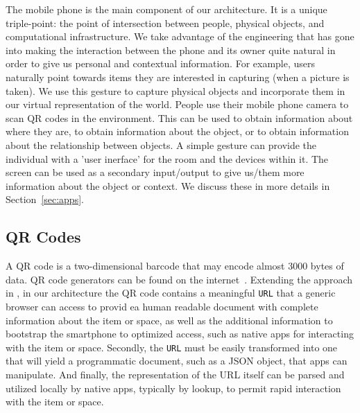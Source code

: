 The mobile phone is the main component of our architecture.  It is a unique triple-point: the point of intersection
between people, physical objects, and computational infrastructure.  We take advantage of the engineering that has gone 
into making the interaction between the phone and its owner quite natural in order to give us personal and contextual
information.  For example, users naturally point towards items they are interested in capturing (when a picture is taken).
We use this gesture to capture physical objects and incorporate them in our virtual representation of the world.
People use their mobile phone camera to scan QR codes in the environment.  This can be used to obtain information
about where they are, to obtain information about the object, or to obtain information about the relationship
between objects. A simple gesture can provide the individual with a 'user
inerface' for the room and the devices within it.
\cite{Enabling ``Smart Spaces:'' Entity Description and User Interface Generation for a Heterogeneous Component-based Distributed System 
T. D. Hodes, R. H. Katz, DARPA/NIST Smart Spaces Workshop, 
Gaithersburg, Maryland, July 1998. 
UC Berkeley Technical Report CSD/98/1008}
The screen can be used as a secondary input/output to give us/them more information about the 
object or context.  We discuss these in more details in Section~\ref{sec:apps}.

\subsection{QR Codes}
\label{sec:qrc}

A QR code is a two-dimensional barcode that may encode almost 3000 bytes of data.  QR code generators
can be found on the internet~\cite{qrcgen1, qrcgen2}.  
Extending the approach in \cite{hbci}, in
our
architecture the QR code contains a meaningful {\tt URL} that a
generic browser can access to provid ea human readable document with complete
information about the item or space, as well as the additional
information to bootstrap the smartphone to optimized access, such as
native apps for interacting with the item or space.  Secondly, the 
{\tt URL}  must be easily transformed into one that will yield a
programmatic document, such as a JSON object, that apps can
manipulate.  And finally, the representation of the URL itself can be
parsed and utilized locally by native apps, typically by lookup, to
permit rapid interaction with the item or space.

